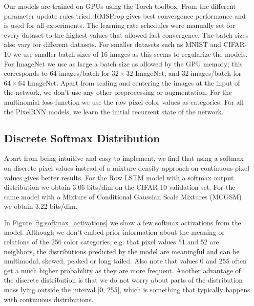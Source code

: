 Our models are trained on GPUs using the Torch toolbox. From the different parameter update rules tried, RMSProp gives best convergence performance and is used for all experiments. The learning rate schedules were manually set for every dataset to the highest values that allowed fast convergence. The batch sizes also vary for different datasets. For smaller datasets such as MNIST and CIFAR-10 we use smaller batch sizes of 16 images as this seems to regularize the models. For ImageNet we use as large a batch size as allowed by the GPU memory; this corresponds to 64 images/batch for $32\times32$ ImageNet, and 32 images/batch for $64\times64$ ImageNet. Apart from scaling and centering the images at the input of the network, we don't use any other preprocessing or augmentation. For the multinomial loss function we use the raw pixel color values as categories. For all the PixelRNN models, we learn the initial recurrent state of the network.

\subsection{Discrete Softmax Distribution}
Apart from being intuitive and easy to implement, we find that using a softmax on discrete pixel values instead of a mixture density approach on continuous pixel values gives better results. For the Row LSTM model with a softmax output distribution we obtain 3.06 bits/dim on the CIFAR-10 validation set. For the same model with a Mixture of Conditional Gaussian Scale Mixtures (MCGSM) \cite{theis2015generative} we obtain 3.22 bits/dim. %

In Figure \ref{fig:softmax_activations} we show a few softmax activations from the model. Although we don't embed prior information about the meaning or relations of the 256 color categories, e.g. that pixel values 51 and 52 are neighbors, the distributions predicted by the model are meaningful and can be multimodal, skewed, peaked or long tailed. Also note that values 0 and 255 often get a much higher probability as they are more frequent. Another advantage of the discrete distribution is that we do not worry about parts of the distribution mass lying outside the interval [0, 255], which is something that typically happens with continuous distributions.

